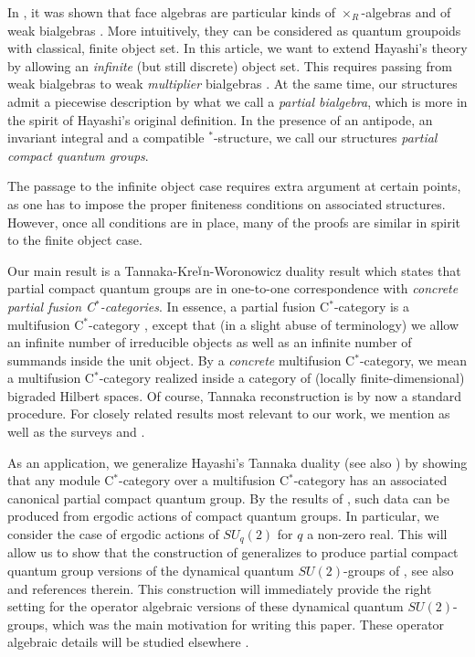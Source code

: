 \documentclass[10pt]{article}
\theoremstyle{definition}
\numberwithin{equation}{section}
\begin{document}
In \cite{Nil1,Sch1,Sch2}, it was shown that face algebras are particular kinds of $\times_R$-algebras \cite{Tak2} and of weak bialgebras \cite{Boh3,BCJ,Nik1}. More intuitively, they can be considered as quantum groupoids with  classical, finite object set. In this article, we want to extend Hayashi's theory by allowing an \emph{infinite} (but still discrete) object set. This requires passing from weak bialgebras to weak \emph{multiplier} bialgebras \cite{Boh1}. At the same time, our structures admit a piecewise description by what we call a \emph{partial bialgebra}, which is more in the spirit of Hayashi's original definition. In the presence of an antipode, an invariant integral and a compatible $^*$-structure, we call our structures \emph{partial compact quantum groups}. 

The passage to the infinite object case requires extra argument at certain points, as one has to impose the proper finiteness conditions on associated structures. However, once all conditions are in place, many of the proofs are similar in spirit to the finite object case. 

Our main result is a Tannaka-Kre$\breve{\textrm{\i}}$n-Woronowicz duality result which states that partial compact quantum groups are in one-to-one correspondence with \emph{concrete partial fusion C$^*$-categories}. In essence, a partial fusion C$^*$-category is a multifusion C$^*$-category \cite{ENO1}, except that (in a slight abuse of terminology) we allow an infinite number of irreducible objects as well as an infinite number of summands inside the unit object. By a \emph{concrete} multifusion C$^*$-category, we mean a multifusion C$^*$-category realized inside a category of (locally finite-dimensional) bigraded Hilbert spaces. Of course, Tannaka reconstruction is by now a standard procedure. For closely related results most relevant to our work, we mention \cite{Wor2,Sch3,Hay8,Ost1,Hai1,Szl1,Pfe1,DCY1,Nes1} as well as the surveys \cite{JoS1} and \cite[Section 2.3]{NeT1}.

As an application, we generalize Hayashi's Tannaka duality \cite{Hay8} (see also \cite{Ost1}) by showing that any module C$^*$-category over a multifusion C$^*$-category has an associated canonical partial compact quantum group. By the results of \cite{DCY1}, such data can be produced from ergodic actions of compact quantum groups. In particular,  we consider the case of ergodic actions of $SU_q(2)$ for $q$ a non-zero real. This will allow us to show that the construction of \cite{Hay4} generalizes to produce partial compact quantum group versions of the dynamical quantum $SU(2)$-groups of \cite{EtV1,KoR1}, see also \cite{Sto1} and references therein. This construction will immediately provide the right setting for the operator algebraic versions of these dynamical quantum $SU(2)$-groups, which was the main motivation for writing this paper. These operator algebraic details will be studied elsewhere \cite{DCT2}.
\end{document}
